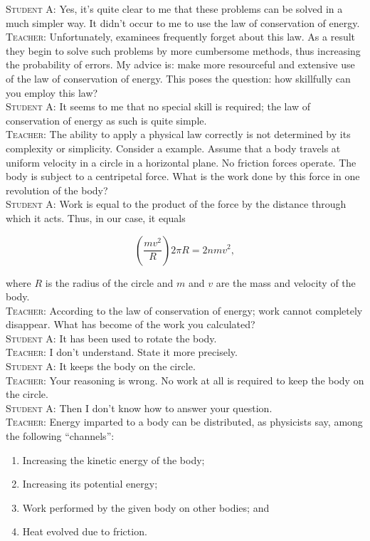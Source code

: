 \documentclass[a4paper,sfsidenotes]{tufte-book}
\begin{document}
\textsc{Student A:} Yes, it's quite clear to me that these problems can be solved in a much simpler way. It didn't occur to me to use the law of conservation of energy.
\\
\textsc{Teacher:} Unfortunately, examinees frequently forget about this law. As a result they begin to solve such problems by more cumbersome methods, thus increasing the probability of errors. My advice is: make more resourceful and extensive use of the law of conservation of energy. This poses the question: how skillfully can you employ this law?
\\
\textsc{Student A:} It seems to me that no special skill is required; the law of conservation of energy as such is quite simple.
\\
\textsc{Teacher:} The ability to apply a physical law correctly is not determined by its complexity or simplicity. Consider a example. Assume that a body travels at uniform velocity in a circle in a horizontal plane. No friction forces operate. The body is subject to a centripetal force. What is the work done
by this force in one revolution of the body?
\\
\textsc{Student A:} Work is equal to the product of the force by the distance through which it acts. Thus, in our case, it equals 

\begin{equation*}
\left(\frac{mv^{2}}{R}\right) 2 \pi R = 2nmv^{2}, 
\end{equation*}

where $R$ is the radius of the circle and $m$ and $v$ are the mass and velocity of the body.
\\
\textsc{Teacher:} According to the law of conservation of energy; work cannot completely disappear. What has become of the work you calculated?
\\
\textsc{Student A:} It has been used to rotate the body.
\\
\textsc{Teacher:} I don't understand. State it more precisely.
\\
\textsc{Student A:} It keeps the body on the circle.
\\
\textsc{Teacher:} Your reasoning is wrong. No work at all is required to keep the body on the circle.
\\
\textsc{Student A:} Then I don't know how to answer your question.
\\
\textsc{Teacher:} Energy imparted to a body can be distributed, as physicists say, among the following ``channels'':
\begin{enumerate}[label=(\arabic*),leftmargin=1.5cm] 
\item Increasing the kinetic energy of the body; 
\item Increasing its potential energy; 
\item Work performed by the given body on other bodies; and 
\item Heat evolved due to friction. 
\end{enumerate}
\end{document}
